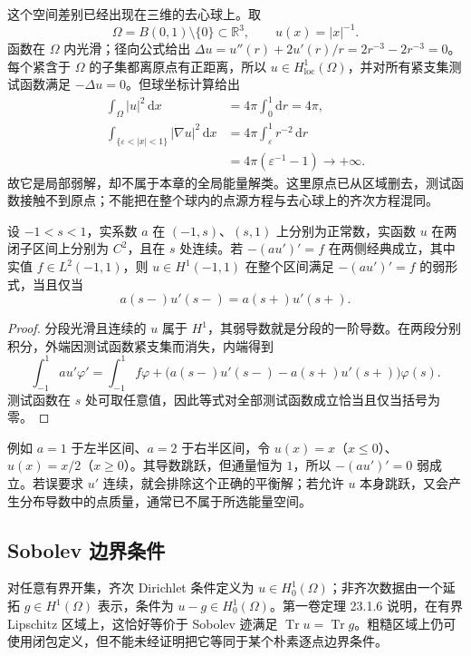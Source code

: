 \ProseParagraphBreak

这个空间差别已经出现在三维的去心球上。取
\[
 \Omega=B(0,1)\setminus\{0\}\subset\mathbb R^3,\qquad u(x)=|x|^{-1}.
\]
函数在 \(\Omega\) 内光滑；径向公式给出
\(\Delta u=u''(r)+2u'(r)/r=2r^{-3}-2r^{-3}=0\)。
每个紧含于 \(\Omega\) 的子集都离原点有正距离，所以 \(u\in H_{\mathrm{loc}}^1(\Omega)\)，并对所有紧支集测试函数满足 \(-\Delta u=0\)。但球坐标计算给出
\[
 \begin{aligned}
 \int_\Omega |u|^2\,\mathrm dx&=4\pi\int_0^1\mathrm dr=4\pi,\\
 \int_{\{\varepsilon<|x|<1\}}|\nabla u|^2\,\mathrm dx
 &=4\pi\int_\varepsilon^1r^{-2}\,\mathrm dr\\
 &=4\pi(\varepsilon^{-1}-1)\longrightarrow+\infty.
 \end{aligned}
\]
故它是局部弱解，却不属于本章的全局能量解类。这里原点已从区域删去，测试函数接触不到原点；不能把在整个球内的点源方程与去心球上的齐次方程混同。

\begin{proposition}[一维界面的通量条件]
\label{b2:prop:15-interface-flux}
设 \(-1<s<1\)，实系数 \(a\) 在 \((-1,s)\)、\((s,1)\) 上分别为正常数，实函数 \(u\) 在两闭子区间上分别为 \(C^2\)，且在 \(s\) 处连续。若 \(-(au')'=f\) 在两侧经典成立，其中实值 \(f\in L^2(-1,1)\)，则 \(u\in H^1(-1,1)\) 在整个区间满足 \(-(au')'=f\) 的弱形式，当且仅当
\[a(s-)u'(s-)=a(s+)u'(s+).\]
\end{proposition}
\begin{proof}
分段光滑且连续的 \(u\) 属于 \(H^1\)，其弱导数就是分段的一阶导数。在两段分别积分，外端因测试函数紧支集而消失，内端得到
\[\int_{-1}^1 au'\varphi'=\int_{-1}^1 f\varphi
  +\bigl(a(s-)u'(s-)-a(s+)u'(s+)\bigr)\varphi(s).\]
测试函数在 \(s\) 处可取任意值，因此等式对全部测试函数成立恰当且仅当括号为零。
\end{proof}

例如 \(a=1\) 于左半区间、\(a=2\) 于右半区间，令 \(u(x)=x\)（\(x\le0\)）、\(u(x)=x/2\)（\(x\ge0\)）。其导数跳跃，但通量恒为 \(1\)，所以 \(-(au')'=0\) 弱成立。若误要求 \(u'\) 连续，就会排除这个正确的平衡解；若允许 \(u\) 本身跳跃，又会产生分布导数中的点质量，通常已不属于所选能量空间。

\subsection{Sobolev 边界条件}
\label{b2:subsec:150103}

对任意有界开集，齐次 Dirichlet 条件定义为 \(u\in H_0^1(\Omega)\)；非齐次数据由一个延拓 \(g\in H^1(\Omega)\) 表示，条件为 \(u-g\in H_0^1(\Omega)\)。第一卷定理 23.1.6 说明，在有界 Lipschitz 区域上，这恰好等价于 Sobolev 迹满足 \(\operatorname{Tr}u=\operatorname{Tr}g\)。粗糙区域上仍可使用闭包定义，但不能未经证明把它等同于某个朴素逐点边界条件。

